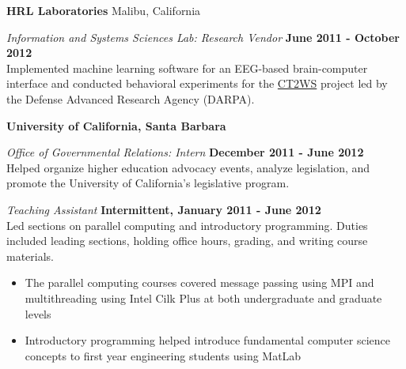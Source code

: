\documentclass[margin,line]{res}
\newenvironment{list1}{
  \begin{list}{\ding{113}}{%
      \setlength{\itemsep}{0in}
      \setlength{\parsep}{0in} \setlength{\parskip}{0in}
      \setlength{\topsep}{0in} \setlength{\partopsep}{0in}
      \setlength{\leftmargin}{0.17in}}}{\end{list}}
\begin{document}
\begin{resume}
\begin{list1}
\end{list1}

{\bf HRL Laboratories} Malibu, California\\
\vspace*{-.1in}
\begin{list1}
\item[] {\em Information and Systems Sciences Lab: Research Vendor} \hfill {\bf June 2011 - October 2012}\\
Implemented machine learning software for an EEG-based brain-computer interface and conducted behavioral experiments for the \href{https://en.wikipedia.org/wiki/Cognitive_Technology_Threat_Warning_System}{CT2WS} project led by the Defense Advanced Research Agency (DARPA).
\end{list1}

{\bf University of California, Santa Barbara}\\
\vspace*{-.1in}
\begin{list1}
\item[] {\em Office of Governmental Relations: Intern} \hfill {\bf December 2011  - June 2012}\\
Helped organize higher education advocacy events, analyze legislation, and promote the University of California's legislative program.\\
\vspace*{-.1in}
\item[] {\em Teaching Assistant} \hfill {\bf Intermittent, January 2011  - June 2012}\\
Led sections on parallel computing and introductory programming. Duties included leading sections, holding office hours, grading, and writing course materials.
\begin{itemize}
\item The parallel computing courses covered message passing using MPI and multithreading using Intel Cilk Plus at both undergraduate and graduate levels
\item Introductory programming helped introduce fundamental computer science concepts to first year engineering students using MatLab
\end{itemize}
\end{list1}


\end{resume}
\end{document}

